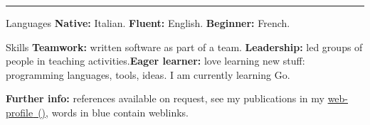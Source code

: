 \vspace{-3mm}
\rule{\textwidth}{0.5pt}\vspace{-1mm}

\begin{cvskills}

\cvskill
{Languages}
{\textbf{Native:} Italian. \textbf{Fluent:} English. \textbf{Beginner:} French.}

\cvskill
{Skills}
{\textbf{Teamwork:} written software as part of a team. \hspace{+5mm} 
\textbf{Leadership:} 
led groups of people in teaching activities.\newline \textbf{Eager learner:} 
love learning new stuff: programming languages, tools, ideas. I am currently 
learning Go.}

\end{cvskills}

\flushleft
\footnotesize
\item {\color{awesome-darknight}\textbf{Further 
info:}} references available on request, see my publications in my 
{\href{https://www.ncl.ac.uk/engineering/staff/profile/alessandrode-gennaro.html}{{\color{myblue}web-profile}~(\profLogo\hspace{-0.8mm})}},
words in {\color{myblue}blue} contain weblinks.